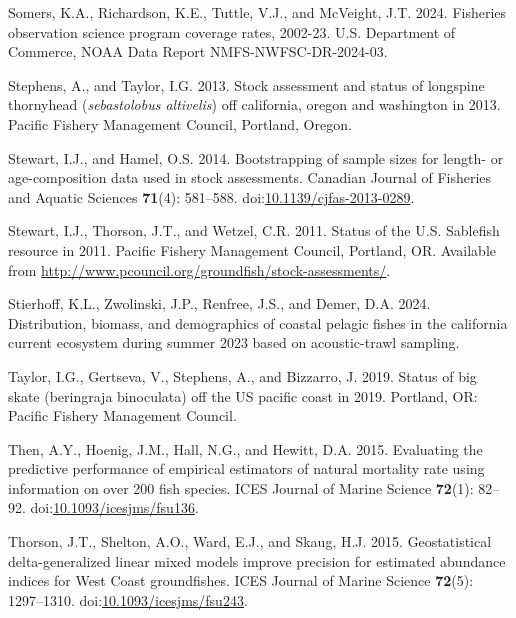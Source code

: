 \documentclass[
  english,
]{article}
\newlength{\cslhangindent}
\newenvironment{CSLReferences}[2] %
 {\begin{list}{}{%
  \setlength{\itemindent}{0pt}
  \setlength{\leftmargin}{0pt}
  \setlength{\parsep}{0pt}
  \ifodd #1
   \setlength{\leftmargin}{\cslhangindent}
   \setlength{\itemindent}{-1\cslhangindent}
  \fi
  \setlength{\itemsep}{#2\baselineskip}}}
 {\end{list}}
\begin{document}
\begin{CSLReferences}{1}{0}
Somers, K.A., Richardson, K.E., Tuttle, V.J., and McVeight, J.T. 2024.
Fisheries observation science program coverage rates, 2002-23. U.S.
Department of Commerce, NOAA Data Report NMFS-NWFSC-DR-2024-03.

Stephens, A., and Taylor, I.G. 2013. Stock assessment and status of
longspine thornyhead (\emph{sebastolobus altivelis}) off california,
oregon and washington in 2013. Pacific Fishery Management Council,
Portland, Oregon.

Stewart, I.J., and Hamel, O.S. 2014. Bootstrapping of sample sizes for
length- or age-composition data used in stock assessments. Canadian
Journal of Fisheries and Aquatic Sciences \textbf{71}(4): 581--588.
doi:\href{https://doi.org/10.1139/cjfas-2013-0289}{10.1139/cjfas-2013-0289}.

Stewart, I.J., Thorson, J.T., and Wetzel, C.R. 2011. Status of the
{U}.{S}. Sablefish resource in 2011. Pacific Fishery Management Council,
Portland, OR. Available from
\url{http://www.pcouncil.org/groundfish/stock-assessments/}.

Stierhoff, K.L., Zwolinski, J.P., Renfree, J.S., and Demer, D.A. 2024.
Distribution, biomass, and demographics of coastal pelagic fishes in the
california current ecosystem during summer 2023 based on acoustic-trawl
sampling.

Taylor, I.G., Gertseva, V., Stephens, A., and Bizzarro, J. 2019. Status
of big skate (beringraja binoculata) off the US pacific coast in 2019.
Portland, OR: Pacific Fishery Management Council.

Then, A.Y., Hoenig, J.M., Hall, N.G., and Hewitt, D.A. 2015. Evaluating
the predictive performance of empirical estimators of natural mortality
rate using information on over 200 fish species. ICES Journal of Marine
Science \textbf{72}(1): 82--92.
doi:\href{https://doi.org/10.1093/icesjms/fsu136}{10.1093/icesjms/fsu136}.

Thorson, J.T., Shelton, A.O., Ward, E.J., and Skaug, H.J. 2015.
Geostatistical delta-generalized linear mixed models improve precision
for estimated abundance indices for {West} {Coast} groundfishes. ICES
Journal of Marine Science \textbf{72}(5): 1297--1310.
doi:\href{https://doi.org/10.1093/icesjms/fsu243}{10.1093/icesjms/fsu243}.


\end{CSLReferences}
\end{document}
